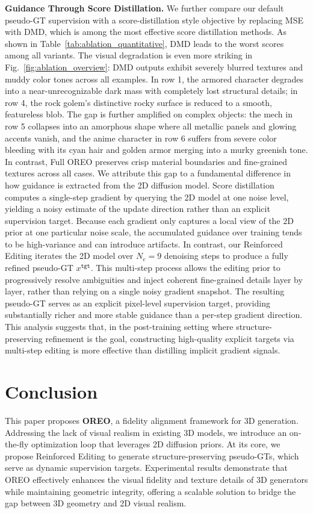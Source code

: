 \documentclass[runningheads]{llncs}
\begin{document}
\textbf{Guidance Through Score Distillation.}
We further compare our default pseudo-GT supervision with a score-distillation style objective by replacing MSE with DMD, which is among the most effective score distillation methods.
As shown in Table~\ref{tab:ablation_quantitative}, DMD leads to the worst scores among all variants.
The visual degradation is even more striking in Fig.~\ref{fig:ablation_overview}: DMD outputs exhibit severely blurred textures and muddy color tones across all examples.
In row 1, the armored character degrades into a near-unrecognizable dark mass with completely lost structural details; in row 4, the rock golem's distinctive rocky surface is reduced to a smooth, featureless blob.
The gap is further amplified on complex objects: the mech in row 5 collapses into an amorphous shape where all metallic panels and glowing accents vanish, and the anime character in row 6 suffers from severe color bleeding with its cyan hair and golden armor merging into a murky greenish tone.
In contrast, Full OREO preserves crisp material boundaries and fine-grained textures across all cases.
We attribute this gap to a fundamental difference in how guidance is extracted from the 2D diffusion model.
Score distillation computes a single-step gradient by querying the 2D model at one noise level, yielding a noisy estimate of the update direction rather than an explicit supervision target.
Because each gradient only captures a local view of the 2D prior at one particular noise scale, the accumulated guidance over training tends to be high-variance and can introduce artifacts.
In contrast, our Reinforced Editing iterates the 2D model over $N_e{=}9$ denoising steps to produce a fully refined pseudo-GT $x^{\texttt{tgt}}$.
This multi-step process allows the editing prior to progressively resolve ambiguities and inject coherent fine-grained details layer by layer, rather than relying on a single noisy gradient snapshot.
The resulting pseudo-GT serves as an explicit pixel-level supervision target, providing substantially richer and more stable guidance than a per-step gradient direction.
This analysis suggests that, in the post-training setting where structure-preserving refinement is the goal, constructing high-quality explicit targets via multi-step editing is more effective than distilling implicit gradient signals.

\section{Conclusion}
This paper proposes \textbf{OREO}, a fidelity alignment framework for 3D generation.
Addressing the lack of visual realism in existing 3D models, we introduce an on-the-fly optimization loop that leverages 2D diffusion priors.
At its core, we propose Reinforced Editing to generate structure-preserving pseudo-GTs, which serve as dynamic supervision targets.
Experimental results demonstrate that OREO effectively enhances the visual fidelity and texture details of 3D generators while maintaining geometric integrity, offering a scalable solution to bridge the gap between 3D geometry and 2D visual realism.
\end{document}
